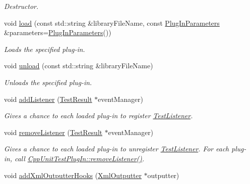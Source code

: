 \begin{DoxyCompactItemize}
\begin{DoxyCompactList}\small\item\em Destructor. \end{DoxyCompactList}\item 
void \hyperlink{class_plug_in_manager_aa617ef22c19ff90d7a56cd048c975afa}{load} (const std\+::string \&library\+File\+Name, const \hyperlink{class_plug_in_parameters}{Plug\+In\+Parameters} \&parameters=\hyperlink{class_plug_in_parameters}{Plug\+In\+Parameters}())
\begin{DoxyCompactList}\small\item\em Loads the specified plug-\/in. \end{DoxyCompactList}\item 
void \hyperlink{class_plug_in_manager_a5366b1e0e2e96e84d09e26893c00c4bf}{unload} (const std\+::string \&library\+File\+Name)
\begin{DoxyCompactList}\small\item\em Unloads the specified plug-\/in. \end{DoxyCompactList}\item 
void \hyperlink{class_plug_in_manager_a3c51a256e3d6ee3bf6fa6c98d74053d1}{add\+Listener} (\hyperlink{class_test_result}{Test\+Result} $\ast$event\+Manager)
\begin{DoxyCompactList}\small\item\em Gives a chance to each loaded plug-\/in to register \hyperlink{class_test_listener}{Test\+Listener}. \end{DoxyCompactList}\item 
\hypertarget{class_plug_in_manager_aea9b8b61e256169b823516868e1d8ad0}{void \hyperlink{class_plug_in_manager_aea9b8b61e256169b823516868e1d8ad0}{remove\+Listener} (\hyperlink{class_test_result}{Test\+Result} $\ast$event\+Manager)}\label{class_plug_in_manager_aea9b8b61e256169b823516868e1d8ad0}

\begin{DoxyCompactList}\small\item\em Gives a chance to each loaded plug-\/in to unregister \hyperlink{class_test_listener}{Test\+Listener}. For each plug-\/in, call \hyperlink{struct_cpp_unit_test_plug_in_a8f36157014b515d38efbc8ab67923d85}{Cpp\+Unit\+Test\+Plug\+In\+::remove\+Listener()}. \end{DoxyCompactList}\item 
\hypertarget{class_plug_in_manager_a4a9c64e0ac3f762b100b993d7e33f889}{void \hyperlink{class_plug_in_manager_a4a9c64e0ac3f762b100b993d7e33f889}{add\+Xml\+Outputter\+Hooks} (\hyperlink{class_xml_outputter}{Xml\+Outputter} $\ast$outputter)}\label{class_plug_in_manager_a4a9c64e0ac3f762b100b993d7e33f889}


\end{DoxyCompactItemize}
